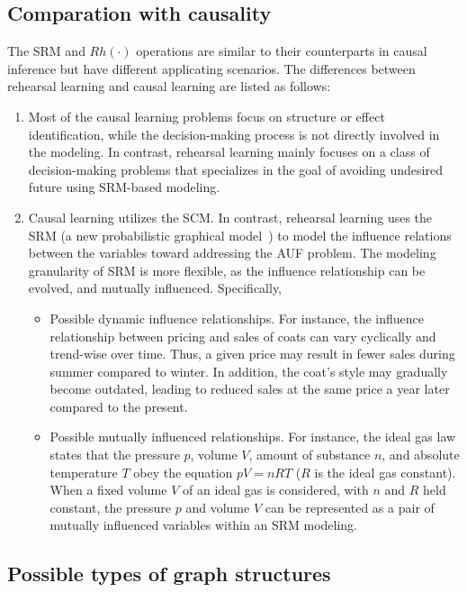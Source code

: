 \documentclass{article}
\theoremstyle{plain}
\theoremstyle{definition}
\theoremstyle{remark}
\begin{document}
\subsection{Comparation with causality}

The SRM and $Rh(\cdot)$ operations are similar to their counterparts in causal inference but have different applicating scenarios. The differences between rehearsal learning and causal learning are listed as follows:
\begin{enumerate}
  \item[1] Most of the causal learning problems focus on structure or effect identification, while the decision-making process is not directly involved in the modeling. In contrast, rehearsal learning mainly focuses on a class of decision-making problems that specializes in the goal of avoiding undesired future using SRM-based modeling.
  \item[2] Causal learning utilizes the SCM. In contrast, rehearsal learning uses the SRM (a new probabilistic graphical model~\citep{qint2023srm}) to model the influence relations between the variables toward addressing the AUF problem. The modeling granularity of SRM is more flexible, as the influence relationship can be evolved, and mutually influenced. Specifically, 
  \begin{itemize}
    \item Possible dynamic influence relationships. For instance, the influence relationship between pricing and sales of coats can vary cyclically and trend-wise over time. Thus, a given price may result in fewer sales during summer compared to winter. In addition, the coat's style may gradually become outdated, leading to reduced sales at the same price a year later compared to the present.
    \item Possible mutually influenced relationships. For instance, the ideal gas law states that the pressure $p$, volume $V$, amount of substance $n$, and absolute temperature $T$ obey the equation $pV = nRT$ ($R$ is the ideal gas constant). When a fixed volume $V$ of an ideal gas is considered, with $n$ and $R$ held constant, the pressure $p$ and volume $V$ can be represented as a pair of mutually influenced variables within an SRM modeling. 
  \end{itemize}
\end{enumerate}


\subsection{Possible types of graph structures}
\label{app:struc_G}
\end{document}
